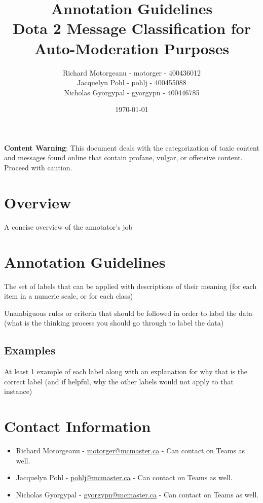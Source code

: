 \documentclass[11pt, letterpaper, notitlepage]{article}
\title{Annotation Guidelines \\ Dota 2 Message Classification for Auto-Moderation Purposes}
\author{Richard Motorgeanu - motorger - 400436012\\ Jacquelyn Pohl - pohlj - 400455088\\ Nicholas Gyorgypal - gyorgypn - 400446785}
\date{\today}
\begin{document}
\maketitle


\vspace{6em}

\large
\textbf{Content Warning}: This document deals with the categorization of toxic content and messages found online that contain profane, vulgar, or offensive content. Proceed with caution.

\vspace{2em}

\newpage

\section[1]{Overview}

A concise overview of the annotator’s job

\newpage

\section[2]{Annotation Guidelines}

The set of labels that can be applied with descriptions of their meaning (for each item in a
numeric scale, or for each class)

Unambiguous rules or criteria that should be followed in order to label the data (what is the
thinking process you should go through to label the data)

\subsection{Examples}

At least 1 example of each label along with an explanation for why that is the correct label
(and if helpful, why the other labels would not apply to that instance)

\newpage

\section[3]{Contact Information}

\begin{itemize}
\item Richard Motorgeanu - \href{motorger@mcmaster.ca}{motorger@mcmaster.ca} - Can contact on Teams as well.
\item Jacquelyn Pohl - \href{pohlj@mcmaster.ca}{pohlj@mcmaster.ca} - Can contact on Teams as well.
\item Nicholas Gyorgypal - \href{gyorgypn@mcmaster.ca}{gyorgypn@mcmaster.ca} - Can contact on Teams as well.
\end{itemize}
\end{document}

